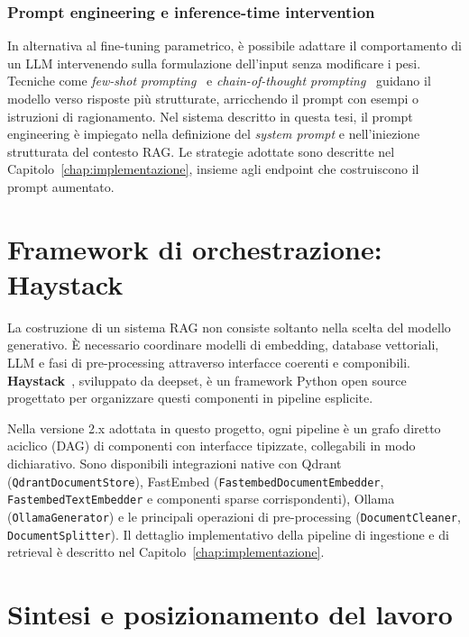 \subsubsection{Prompt engineering e inference-time intervention}

In alternativa al fine-tuning parametrico, è possibile adattare il comportamento
di un LLM intervenendo sulla formulazione dell'input senza modificare i pesi.
Tecniche come \textit{few-shot prompting}~\cite{brown2020language} e
\textit{chain-of-thought prompting}~\cite{wei2022chain} guidano il modello verso
risposte più strutturate, arricchendo il prompt con esempi o istruzioni di
ragionamento. Nel sistema descritto in questa tesi, il prompt engineering è
impiegato nella definizione del \textit{system prompt} e nell'iniezione
strutturata del contesto RAG. Le strategie adottate sono descritte nel
Capitolo~\ref{chap:implementazione}, insieme agli endpoint che costruiscono il
prompt aumentato.

\section{Framework di orchestrazione: Haystack}
\label{sec:haystack}

La costruzione di un sistema RAG non consiste soltanto nella scelta del modello
generativo. È necessario coordinare modelli di embedding, database vettoriali,
LLM e fasi di pre-processing attraverso interfacce coerenti e componibili.
\textbf{Haystack}~\cite{haystack2023}, sviluppato da deepset, è un framework
Python open source progettato per organizzare questi componenti in pipeline
esplicite.

Nella versione 2.x adottata in questo progetto, ogni pipeline è un grafo
diretto aciclico (DAG) di componenti con interfacce tipizzate, collegabili in
modo dichiarativo. Sono disponibili integrazioni native con Qdrant
(\texttt{QdrantDocumentStore}), FastEmbed
(\texttt{FastembedDocumentEmbedder}, \texttt{FastembedTextEmbedder} e
componenti sparse corrispondenti), Ollama (\texttt{OllamaGenerator}) e le
principali operazioni di pre-processing (\texttt{DocumentCleaner},
\texttt{DocumentSplitter}).
Il dettaglio implementativo della pipeline di ingestione e di retrieval è
descritto nel Capitolo~\ref{chap:implementazione}.

\section{Sintesi e posizionamento del lavoro}
\label{sec:background_summary}

